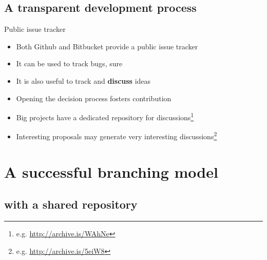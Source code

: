 \documentclass[presentation]{beamer}
\begin{document}
\subsection{A transparent development process}

\begin{frame}{Public issue tracker}
    \begin{itemize}
        \item Both Github and Bitbucket provide a public issue tracker
        \item It can be used to track bugs, sure
        \item It is also useful to track and \textbf{discuss} ideas
        \item Opening the decision process fosters contribution
        \item Big projects have a dedicated repository for discussions\footnote{e.g. \url{http://archive.is/WAhNe}}
        \item Interesting proposals may generate very interesting discussions\footnote{e.g. \url{http://archive.is/5eiW8}}
    \end{itemize}
\end{frame}



\section{A successful branching model}

\subsection{with a shared repository}
\end{document}
